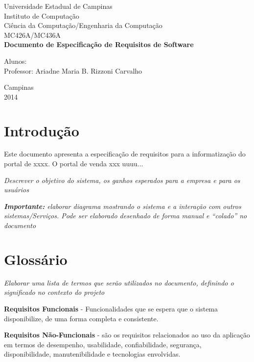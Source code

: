 \documentclass[12pt,twoside,a4paper]{article}
\begin{document}
\begin{titlepage}
\begin{center}
{\large Universidade Estadual de Campinas}\\[0.2cm]
{\large Instituto de Computação}\\[0.2cm]
{\large Ciência da Computação/Engenharia da Computação}\\[0.2cm]
{\large MC426A/MC436A}\\[5.1cm]
{\bf \huge Documento de Especificação de Requisitos de Software}\\[5.1cm]
\end{center}
{\large Alunos:}\\[0.7cm]
{\large Professor: Ariadne Maria B. Rizzoni Carvalho}\\[4.1cm]
\begin{center}
{\large Campinas}\\[0.2cm]
{\large 2014}
\end{center}
\end{titlepage}


\section{Introdução}

Este documento apresenta a especificação de requisitos para a informatização do portal de xxxx.  O portal de venda xxx uuuu...

\textit{Descrever o objetivo do sistema, os ganhos esperados para a empresa e para os usuários}

\textit{\textbf{Importante:} elaborar diagrama mostrando o sistema e a interação com outros sistemas/Serviços. Pode ser elaborado desenhado de forma manual e “colado” no documento} 


\section{Glossário}
\textit{Elaborar uma lista de termos que serão utilizados no documento, definindo o significado no contexto do projeto}

\textbf{Requisitos Funcionais} - Funcionalidades que se espera que o sistema disponibilize, de uma forma completa e consistente.

\textbf{Requisitos Não-Funcionais} - são os requisitos relacionados ao uso da aplicação em termos de desempenho, usabilidade, confiabilidade, segurança, disponibilidade, manutenibilidade e tecnologias envolvidas.
 
\end{document}
